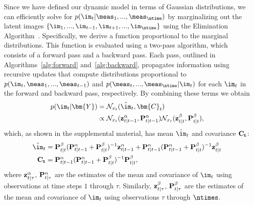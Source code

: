 

Since we have defined our dynamic model in terms of Gaussian distributions, we can efficiently solve for $p(\im_t | \meas_1,...,\meas_\ntime)$ by marginalizing out the latent images $ \{ \im_1,...,\im_{t-1},\im_{t+1},...,\im_{\ntime} \}$ using the Elimination Algorithm~\cite{graphicalmodels}. Specifically, we derive a function proportional to the marginal distributions. This function is evaluated using a two-pass algorithm, which consists of a forward pass and a backward pass. Each pass, outlined in Algorithms~\ref{alg:forward} and~\ref{alg:backward}, propagates information using recursive updates that compute distributions proportional to 
$p(\im_t, \meas_1,...,\meas_{t-1})$ and $p( \meas_{t},...,\meas_{\ntime} | \im_t )$ 
for each $\im_t$ in the forward and backward pass, respectively. By combining these terms we obtain
\begin{align}
\label{eq:marg1}
p(\im_t|\bm{Y}) & = \mathcal{N}_{x_t}(\hat{\im}_t, \bm{C}_t ) \\
\notag & \propto \mathcal{N}_{x_t}({\bf z}^{\alpha}_{t|t-1}, {\bf P}^{\alpha}_{t|t-1})  \mathcal{N}_{x_{t}}( {\bf z}^{\beta}_{t|t} , {\bf P}^{\beta}_{t|t} ),
\end{align}
which, as shown in the supplemental material, has mean $\hat{\im}_t$ and covariance $\bf{C}_t$:
{\footnotesize
	\begin{align}
	\notag    \hat{\im}_t & = {\bf P}^{\beta}_{t|t} ( {\bf P}^{\alpha}_{t|t-1} + {\bf P}^{\beta}_{t|t})^{-1} {\bf z}^{\alpha}_{t|t-1}  +   {\bf P}^{\alpha}_{t|t-1}( {\bf P}^{\alpha}_{t|t-1} + {\bf P}^{\beta}_{t|t})^{-1} {\bf z}^{\beta}_{t|t} \\
	\bf{C}_t & =  {\bf P}^{\alpha}_{t|t-1}( {\bf P}^{\alpha}_{t|t-1} + {\bf P}^{\beta}_{t|t})^{-1} {\bf P}^{\beta}_{t|t} , 
	\label{eq:marg2}
	\end{align}
}where ${\bf z}_{t|\tau}^{\alpha}$, ${\bf P}_{t|\tau}^{\alpha}$ are the estimates of the mean and covariance of $\im_t$ using observations at time steps $1$ through $\tau$. Similarly, ${\bf z}_{t|\tau}^{\beta}$, ${\bf P}_{t|\tau}^{\beta}$ are the estimates of the mean and covariance of $\im_t$ using observations $\tau$ through $\ntimes$.



